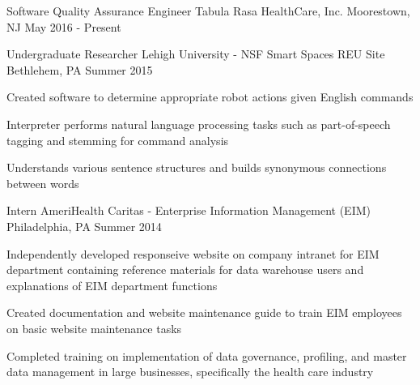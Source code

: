 

\begin{cventries}

  \cventry
    {Software Quality Assurance Engineer} %
    {Tabula Rasa HealthCare, Inc.} %
    {Moorestown, NJ} %
    {May 2016 - Present} %
    {
      \begin{cvitems} %
        \item {}
        \item {}
        \item {}
      \end{cvitems}
    }

  \cventry
    {Undergraduate Researcher} %
    {Lehigh University - NSF Smart Spaces REU Site} %
    {Bethlehem, PA} %
    {Summer 2015} %
    {
      \begin{cvitems} %
        \item {Created software to determine appropriate robot actions given English commands}
        \item {Interpreter performs natural language processing tasks such as part-of-speech tagging and stemming for command analysis}
        \item {Understands various sentence structures and builds synonymous connections between words}
      \end{cvitems}
    }

  \cventry
    {Intern} %
    {AmeriHealth Caritas - Enterprise Information Management (EIM)} %
    {Philadelphia, PA} %
    {Summer 2014} %
    {
      \begin{cvitems} %
        \item {Independently developed responseive website on company intranet for EIM department containing reference materials for data warehouse users and explanations of EIM department functions}
        \item {Created documentation and website maintenance guide to train EIM employees on basic website maintenance tasks}
        \item {Completed training on implementation of data governance, profiling, and master data management in large businesses, specifically the health care industry}
      \end{cvitems}
    }

\end{cventries}
